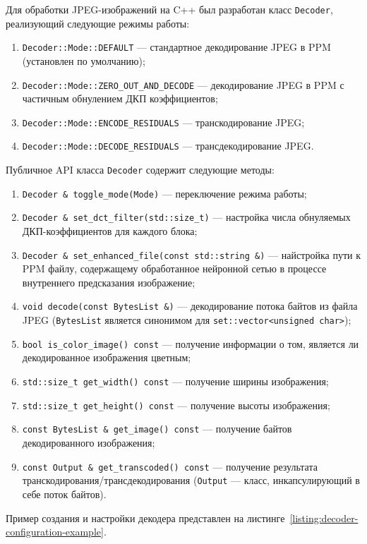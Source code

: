 \documentclass[times,specification,annotation]{itmo-student-thesis}
\begin{document}
Для обработки JPEG-изображений на C++ был разработан класс \texttt{Decoder}, реализующий следующие режимы работы:
\begin{enumerate}
    \item \texttt{Decoder::Mode::DEFAULT} --- стандартное декодирование JPEG в PPM (установлен по умолчанию);
    \item \texttt{Decoder::Mode::ZERO\_OUT\_AND\_DECODE} --- декодирование JPEG в PPM с частичным обнулением ДКП коэффициентов;
    \item \texttt{Decoder::Mode::ENCODE\_RESIDUALS} --- транскодирование JPEG;
    \item \texttt{Decoder::Mode::DECODE\_RESIDUALS} --- трансдекодирование JPEG.
\end{enumerate}

Публичное API класса \texttt{Decoder} содержит следующие методы:
\begin{enumerate}
    \item \texttt{Decoder \& toggle\_mode(Mode)} --- переключение режима работы;
    \item \texttt{Decoder \& set\_dct\_filter(std::size\_t)} --- настройка числа обнуляемых ДКП-коэффициентов для каждого блока;
    \item \texttt{Decoder \& set\_enhanced\_file(const std::string \&)} --- найстройка пути к PPM файлу, содержащему обработанное нейронной сетью в процессе внутреннего предсказания изображение;
    \item \texttt{void decode(const BytesList \&)} --- декодирование потока байтов из файла JPEG (\texttt{BytesList} является синонимом для \texttt{set::vector<unsigned char>});
    \item \texttt{bool is\_color\_image() const} --- получение информации о том, является ли декодированное изображения цветным;
    \item \texttt{std::size\_t get\_width() const} --- получение ширины изображения;
    \item \texttt{std::size\_t get\_height() const} --- получение высоты изображения;
    \item \texttt{const BytesList \& get\_image() const} --- получение байтов декодированного изображения;
    \item \texttt{const Output \& get\_transcoded() const} --- получение результата транскодирования/трансдекодирования (\texttt{Output} --- класс, инкапсулирующий в себе поток байтов).
\end{enumerate}

Пример создания и настройки декодера представлен на листинге~\ref{listing:decoder-configuration-example}.\par
\end{document}
